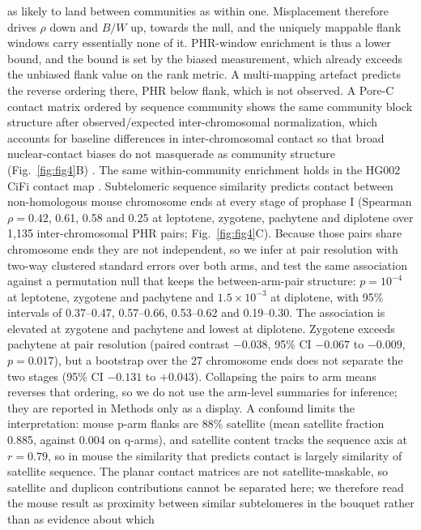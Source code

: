 \documentclass[pdflatex,mathphys]{jnl}
\begin{document}
as likely to land between communities as within one. Misplacement therefore
drives $\rho$ down and $B/W$ up, towards the null, and the uniquely mappable
flank windows carry essentially none of it. PHR-window enrichment is thus a
lower bound, and the bound is set by the biased measurement, which already
exceeds the unbiased flank value on the rank metric. A multi-mapping artefact
predicts the reverse ordering there, PHR below flank, which is not observed.
A Pore-C contact matrix \cite{Ulahannan2019} ordered by sequence community shows
the same community block structure after observed/expected inter-chromosomal
normalization, which accounts for baseline differences in inter-chromosomal
contact so that broad nuclear-contact biases do not masquerade as community
structure (Fig.~\ref{fig:fig4}B)
\cite{hic3d_liebermanaiden2009,hic3d_imakaev2012}.
The same within-community enrichment holds in the HG002 CiFi contact map
\cite{hic3d_cifi2025}.
Subtelomeric sequence similarity predicts contact between non-homologous mouse chromosome
ends at every stage of prophase I (Spearman $\rho = 0.42$, 0.61, 0.58 and 0.25 at leptotene,
zygotene, pachytene and diplotene over 1{,}135 inter-chromosomal PHR pairs; Fig.~\ref{fig:fig4}C).
Because those pairs share chromosome ends they are not independent, so we infer at pair
resolution with two-way clustered standard errors over both arms, and test the same association
against a permutation null that keeps the between-arm-pair structure: $p = 10^{-4}$ at leptotene,
zygotene and pachytene and $1.5 \times 10^{-3}$ at diplotene, with 95\% intervals of
0.37--0.47, 0.57--0.66, 0.53--0.62 and 0.19--0.30. The association is elevated at zygotene and
pachytene and lowest at diplotene. Zygotene exceeds pachytene at pair resolution (paired contrast
$-0.038$, 95\% CI $-0.067$ to $-0.009$, $p = 0.017$), but a bootstrap over the 27 chromosome ends
does not separate the two stages (95\% CI $-0.131$ to $+0.043$).
Collapsing the pairs to arm means reverses that ordering, so we do not use the arm-level
summaries for inference; they are reported in Methods only as a display.
A confound limits the interpretation: mouse p-arm flanks are 88\% satellite (mean satellite
fraction 0.885, against 0.004 on q-arms), and satellite content tracks the sequence axis at
$r = 0.79$, so in mouse the similarity that predicts contact is largely similarity of
satellite sequence. The planar contact matrices are not satellite-maskable, so satellite and
duplicon contributions cannot be separated here; we therefore read the mouse result as
proximity between similar subtelomeres in the bouquet rather than as evidence about which
\end{document}
